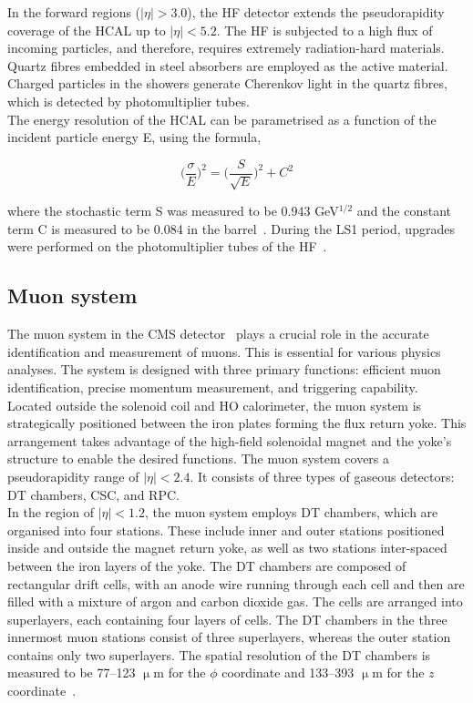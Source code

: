 In the forward regions ($|\eta| > 3.0$), the \ac{HF} detector extends the pseudorapidity coverage of the \ac{HCAL} up to $|\eta| < 5.2$. 
The \ac{HF} is subjected to a high flux of incoming particles, and therefore, requires extremely radiation-hard materials. 
Quartz fibres embedded in steel absorbers are employed as the active material. 
Charged particles in the showers generate Cherenkov light in the quartz fibres, which is detected by photomultiplier tubes. \\

The energy resolution of the \ac{HCAL} can be parametrised as a function of the incident particle energy E, using the formula, 

\begin{equation}
\Big(\frac{\sigma}{E}\Big)^2 = \Big(\frac{S}{\sqrt{E}}\Big)^2 + C^2
\end{equation}

where the stochastic term S was measured to be 0.943 GeV${^{1/2}}$ and the constant term C is measured to be 0.084 in the barrel~\cite{USCMS:2009fxn}.
During the \ac{LS1} period, upgrades were performed on the photomultiplier tubes of the \ac{HF}~\cite{CMS:2012tda}.

\subsection{Muon system}

The muon system in the \ac{CMS} detector~\cite{CMS_Setup,Abbiendi:2015txa} plays a crucial role in the accurate identification and measurement of muons. 
This is essential for various physics analyses. 
The system is designed with three primary functions: efficient muon identification, precise momentum measurement, and triggering capability. \\

Located outside the solenoid coil and \ac{HO} calorimeter, the muon system is strategically positioned between the iron plates forming the flux return yoke. 
This arrangement takes advantage of the high-field solenoidal magnet and the yoke's structure to enable the desired functions.
The muon system covers a pseudorapidity range of $|\eta| < 2.4$. 
It consists of three types of gaseous detectors: \ac{DT} chambers, \ac{CSC}, and \ac{RPC}. \\

In the region of $|\eta| < 1.2$, the muon system employs \ac{DT} chambers, which are organised into four stations. 
These include inner and outer stations positioned inside and outside the magnet return yoke, as well as two stations inter-spaced between the iron layers of the yoke. 
The \ac{DT} chambers are composed of rectangular drift cells, with an anode wire running through each cell and then are filled with a mixture of argon and carbon dioxide gas. 
The cells are arranged into superlayers, each containing four layers of cells. 
The \ac{DT} chambers in the three innermost muon stations consist of three superlayers, whereas the outer station contains only two superlayers. 
The spatial resolution of the \ac{DT} chambers is measured to be 77–123 $\upmu$m for the $\phi$ coordinate and 133–393 $\upmu$m for the $z$ coordinate~\cite{CMS:2018rym}. \\

